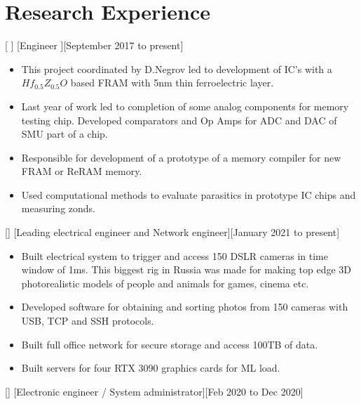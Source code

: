 \documentclass{article}
\begin{document}
\section{Research Experience}
 
[   ]
[Engineer ][September 2017 to present]
 
\begin{itemize}
\item This project coordinated by D.Negrov led to development of IC's with a $Hf_{0.5} Z_{0.5} O $ based  FRAM with 5nm thin ferroelectric layer.
\item Last year of work led to completion of some analog components for memory testing chip. Developed comparators and Op Amps for ADC and DAC of SMU part of a chip.
\item Responsible for development of a prototype of a memory  compiler for new FRAM or ReRAM memory.
\item Used computational methods to evaluate parasitics in prototype IC chips and measuring zonds.
 
\end{itemize}
 
[]
[Leading electrical engineer and Network engineer][January 2021 to present]
 
\begin{itemize}
   \item Built electrical system to trigger and access 150 DSLR cameras in time window of 1ms. This biggest rig in Russia was made for making top edge 3D photorealistic models of people and animals for games, cinema etc.
   \item Developed software for obtaining and sorting photos from 150 cameras with USB, TCP and SSH protocols.
   \item Built full office network for secure storage and access 100TB of data.
   \item Built servers for four RTX 3090 graphics cards for ML load. 
   \end{itemize}
 
[]
[Electronic engineer / System administrator][Feb 2020 to Dec 2020]
 
\end{document}
